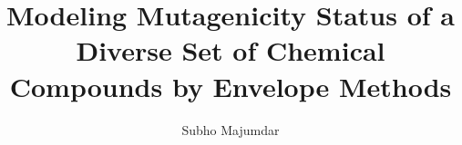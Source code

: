 \documentclass[8pt]{llncs}
\begin{document}
\title{Modeling Mutagenicity Status of a Diverse Set of Chemical Compounds by Envelope Methods}
\author{Subho Majumdar}
\maketitle

%

\end{document}

